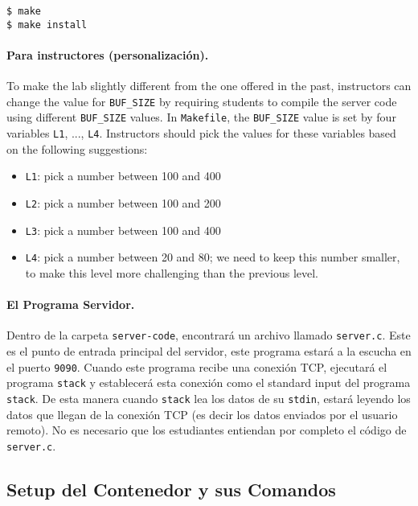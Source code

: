 \begin{lstlisting}
$ make
$ make install
\end{lstlisting}
 

\paragraph{Para instructores (personalización).}
To make the lab slightly different from the one offered in the past,
instructors can change the value for \texttt{BUF\_SIZE} by requiring
students to compile the server code using different \texttt{BUF\_SIZE} values.
In \texttt{Makefile}, the \texttt{BUF\_SIZE} value is set by
four variables \texttt{L1}, ..., \texttt{L4}.
Instructors should pick the values for these variables based
on the following suggestions:

\begin{itemize}[noitemsep]
\item \texttt{L1}: pick a number between 100 and 400
\item \texttt{L2}: pick a number between 100 and 200
\item \texttt{L3}: pick a number between 100 and 400
\item \texttt{L4}: pick a number between 20 and 80;
we need to keep this number smaller, to make this level more challenging 
than the previous level. 
\end{itemize}



\paragraph{El Programa Servidor.} 
Dentro de la carpeta \texttt{server-code}, encontrará un archivo llamado \texttt{server.c}.
Este es el punto de entrada principal del servidor, este programa estará a la escucha en el puerto \texttt{9090}. 
Cuando este programa recibe una conexión TCP, ejecutará el programa \texttt{stack} y establecerá esta conexión como el standard input del programa \texttt{stack}. De esta manera cuando \texttt{stack} lea los datos de su \texttt{stdin}, estará leyendo los datos que llegan de la conexión TCP (es decir los datos enviados por el usuario remoto). No es necesario que los estudiantes entiendan por completo el código de \texttt{server.c}.


\subsection{Setup del Contenedor y sus Comandos}

